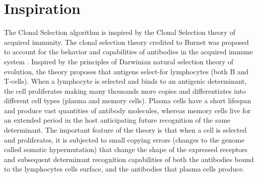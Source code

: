 \documentclass[a4paper, 11pt]{article}
\begin{document}
\section{Inspiration}
\label{sec:inspiration}
The Clonal Selection algorithm is inspired by the Clonal Selection theory of acquired immunity.
The clonal selection theory credited to Burnet was proposed to account for the behavior and capabilities of antibodies in the acquired immune system \cite{Burnet1957, Burnet1959}. Inspired by the principles of Darwinian natural selection theory of evolution, the theory proposes that antigens select-for lymphocytes (both B and T-cells). When a lymphocyte is selected and binds to an antigenic determinant, the cell proliferates making many thousands more copies and differentiates into different cell types (plasma and memory cells). Plasma cells have a short lifespan and produce vast quantities of antibody molecules, whereas memory cells live for an extended period in the host anticipating future recognition of the same determinant. The important feature of the theory is that when a cell is selected and proliferates, it is subjected to small copying errors (changes to the genome called somatic hypermutation) that change the shape of the expressed receptors and subsequent determinant recognition capabilities of both the antibodies bound to the lymphocytes cells surface, and the antibodies that plasma cells produce.

\end{document}
